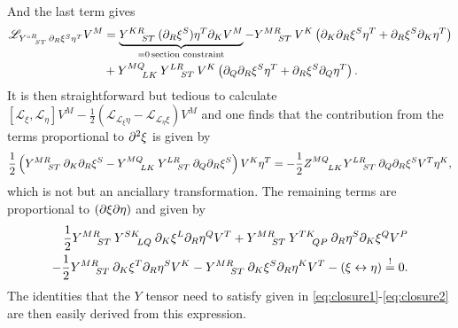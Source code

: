 And the last term gives 
\begin{equation}
    \begin{aligned}
        \mathscr{L}_{\tensor{Y}{^{\circ R}_{ST}}\pd_R\xi^S\eta^T}V^M &= \underbrace{\tensor{Y}{^{KR}_{ST}}(\pd_R\xi^S)\eta^T\pd_KV^M}_{=0\, \text{section constraint}}-\tensor{Y}{^{MR}_{ST}}V^K\left(\pd_K\pd_R\xi^S\eta^T+\pd_R\xi^S\pd_K\eta^T\right)\\
        &+\tensor{Y}{^{MQ}_{LK}}\tensor{Y}{^{LR}_{ST}}V^K\left(\pd_Q\pd_R\xi^S\eta^T+\pd_R\xi^S\pd_Q\eta^T\right).
    \end{aligned}
\end{equation}
It is then straightforward but tedious to calculate $[\mathscr{L}_\xi,\mathscr{L}_\eta] V^M-\frac{1}{2}(\mathscr{L}_{\mathscr{L}_\xi\eta}-\mathscr{L}_{\mathscr{L}_\eta\xi})V^M$ and one finds that the contribution from the terms proportional to $\partial^2\xi$ is given by
\begin{equation}
    \frac{1}{2}\left(\tensor{Y}{^{MR}_{ST}}\pd_K\pd_R\xi^S-\tensor{Y}{^{MQ}_{LK}}\tensor{Y}{^{LR}_{ST}}\pd_Q\pd_R\xi^S\right)V^K\eta^T = -\frac{1}{2}\tensor{Z}{^{MQ}_{LK}}\tensor{Y}{^{LR}_{ST}}\pd_Q\pd_R\xi^SV^T\eta^K,
\end{equation}
which is not but an anciallary transformation. The remaining terms are proportional to $(\partial\xi\partial\eta)$ and given by 
\begin{equation}
    \begin{aligned}
        \frac{1}{2}\tensor{Y}{^{MR}_{ST}}\tensor{Y}{^{SK}_{LQ}}\pd_K\xi^L\pd_R\eta^QV^T+\tensor{Y}{^{MR}_{ST}}\tensor{Y}{^{TK}_{QP}}\pd_R\eta^S\pd_K\xi^QV^P\\
        -\frac{1}{2}\tensor{Y}{^{MR}_{ST}}\pd_K\xi^T\pd_R\eta^SV^K-\tensor{Y}{^{MR}_{ST}}\pd_K\xi^S\pd_R\eta^KV^T-(\xi\leftrightarrow\eta) \overset{!}{=}0.
    \end{aligned}
\end{equation}
The identities that the $Y$ tensor need to satisfy given in \eqref{eq:closure1}-\eqref{eq:closure2} are then easily derived from this expression. 

